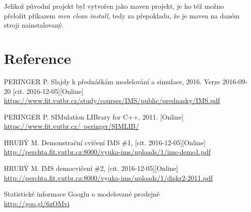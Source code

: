 \documentclass[12pt,a4paper,titlepage]{article}
\begin{document}
Jelikož původní projekt byl vytvořen jako maven projekt, je ho též možno přeložit příkazem \textit{mvn clean install}, tedy za přepokladu, že je maven na daném stroji nainstalovaný.


\section*{Reference}
\begin{enumerate}[label={[\arabic*]}]
\item PERINGER P. Slajdy k přednáškám modelování a simulace, 2016. Verze  2016-09-20 [cit. 2016-12-05][Online] \\
     \href{https://www.fit.vutbr.cz/study/courses/IMS/public/prednasky/IMS.pdf}
          {https://www.fit.vutbr.cz/study/courses/IMS/public/prednasky/IMS.pdf}
     \label{prezentace}

\item PERINGER P. SIMulation LIBrary for C++, 2011. [Online] \\
    \href{https://www.fit.vutbr.cz/~peringer/SIMLIB/}
         {https://www.fit.vutbr.cz/~peringer/SIMLIB/}
    \label{demo1}

\item HRUBÝ M. Demonstrační cvičení IMS \#1, [cit. 2016-12-05][Online] \\
    \href{http://perchta.fit.vutbr.cz:8000/vyuka-ims/uploads/1/ims-demo1.pdf}
        {http://perchta.fit.vutbr.cz:8000/vyuka-ims/uploads/1/ims-demo1.pdf}
    \label{demo2}

\item HRUBÝ M. IMS democvičení \#2, [cit. 2016-12-05][Online] \\
    \href{http://perchta.fit.vutbr.cz:8000/vyuka-ims/uploads/1/diskr2-2011.pdf}
        {http://perchta.fit.vutbr.cz:8000/vyuka-ims/uploads/1/diskr2-2011.pdf}
    \label{simlib}

\item Statistické informace Googlu o modelované prodejně \\
     \href{http://goo.gl/6zOMvi}
          {http://goo.gl/6zOMvi}
     \label{google-shop}
\end{enumerate}
\end{document}
